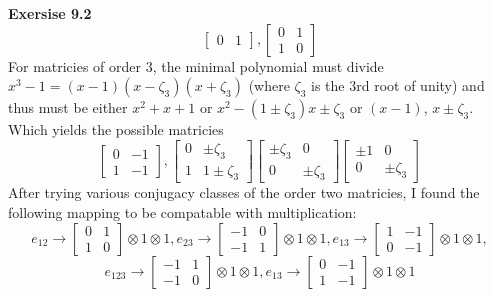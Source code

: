 \documentclass[12pt]{article}
\newenvironment{ques}[1]{\textbf{Exersise #1}\vspace{1 mm}\\ }{\bigskip}
\theoremstyle{definition}
\newcommand{\tensor}{\otimes}
\begin{document}
\begin{ques}{9.2}
$$\begin{bmatrix}
		0 &  1
	\end{bmatrix},
	\begin{bmatrix}
		0 & 1 \\
		1 & 0
	\end{bmatrix}
	$$
	For matricies of order $3$, the minimal polynomial must divide $x^3 - 1
	= (x-1)(x-\zeta_3)(x+\zeta_3)$ (where $\zeta_3$ is the 3rd root of unity)
	and thus must be either $x^2 + x+1$ or $x^2 - (1\pm \zeta_3)x \pm \zeta_3$
	or $(x -1)$, $x\pm \zeta_3$. Which yields the possible matricies
	$$
	\begin{bmatrix}
		0 & -1 \\
		1 & -1
	\end{bmatrix},
	\begin{bmatrix}
		0 & \pm \zeta_3 \\
		1 & 1 \pm \zeta_3
	\end{bmatrix}
	\begin{bmatrix}
		\pm \zeta_3 & 0 \\
		0 & \pm \zeta_3
	\end{bmatrix}
	\begin{bmatrix}
		\pm 1 & 0 \\
		0 & \pm \zeta_3
	\end{bmatrix}
	$$
	After trying various conjugacy classes of the order two matricies, I found
	the following mapping to be compatable with multiplication:
	$$
	e_{12} \to \begin{bmatrix}
		0 & 1 \\
		1 & 0
	\end{bmatrix} \tensor 1 \tensor 1,
	e_{23} \to \begin{bmatrix}
		-1 & 0 \\
		-1 & 1
	\end{bmatrix} \tensor 1 \tensor 1,
	e_{13} \to \begin{bmatrix}
		1 & -1 \\
		0 & -1
	\end{bmatrix} \tensor 1 \tensor 1,
	$$
	$$
	e_{123} \to \begin{bmatrix}
		-1 & 1 \\
		-1 & 0
	\end{bmatrix} \tensor 1 \tensor 1,
	e_{13} \to \begin{bmatrix}
		0 & -1 \\
		1 & -1
	\end{bmatrix} \tensor 1 \tensor 1
	$$
\end{ques}
\end{document}
